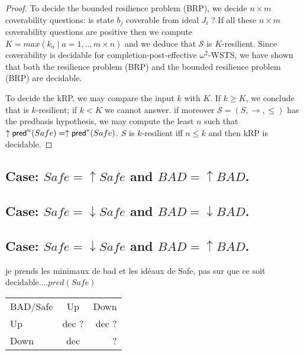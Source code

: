 \begin{proof}
%

To decide the %
 bounded resilience problem (BRP), we decide $n \times m$ coverability questions: is state $b_j$ coverable from ideal $J_i$ ? If all these $n \times m$ coverability questions are positive then we compute $K=max(k_a \mid a=1,..,m \times n)$ and we deduce that  $\mathscr{S}$ is %
  $K$-resilient. Since coverability is decidable for completion-post-effective $\omega^2$-WSTS, we have shown that both the %
  resilience problem (BRP) and the %
  bounded resilience problem (BRP) are decidable.

To decide the kRP, we may compare the input $k$ with $K$. If $k \geq K$, we conclude that is %
$k$-resilient; if $k < K$ we cannot answer. if moreover $\mathscr{S}=(S,\rightarrow, \leq)$ has the predbasis hypothesis, we may compute the least $n$ such that $ \uparrow \textsf{pred}^n(Safe)=  \uparrow \textsf{pred}^*(Safe)$. $S$ is %
 $k$-resilient iff $n \leq k$ and then kRP is decidable.
\end{proof}

%

\subsection{Case: $Safe=\uparrow Safe$ and $BAD=\uparrow BAD$.}




\subsection{Case: $Safe=\downarrow Safe$ and $BAD=\downarrow BAD$.}

\subsection{Case: $Safe=\downarrow Safe$ and $BAD=\uparrow BAD$.}
%
%
je prends les minimaux de bad et les idéaux de Safe, pas sur que ce soit decidable....$pred(Safe)$


\begin{tabular}{ l c r }
   BAD/Safe & Up & Down \\
   Up & dec ? & dec ? \\
   Down & dec & ? \\
 \end{tabular}





